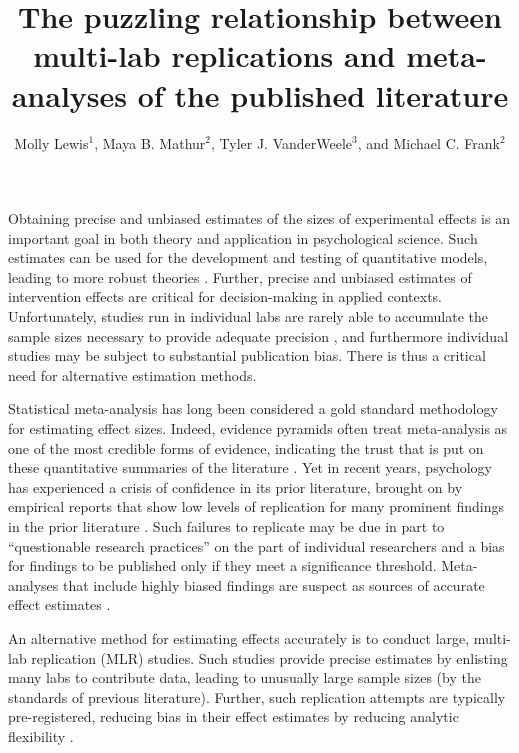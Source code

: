\documentclass[man,floatsintext]{apa7}
\title{The puzzling relationship between multi-lab replications and 
meta-analyses of the published literature
}
\author{Molly Lewis$^{1}$, Maya B. Mathur$^{2}$, Tyler J. VanderWeele$^{3}$, and Michael C. Frank$^{2}$}
\affiliation{$^{1}$Carnegie Mellon University\\
$^{2}$Stanford University\\
$^{3}$Harvard University}
\begin{document}
\maketitle


Obtaining precise and unbiased estimates of the sizes of experimental effects is an important goal in both theory and application in psychological science. Such estimates can be used for the development and testing of quantitative models, leading to more robust theories \parencite{oberauer2019addressing}. Further, precise and unbiased estimates of intervention effects are critical for decision-making in applied contexts. Unfortunately, studies run in individual labs are rarely able to accumulate the sample sizes necessary to provide adequate precision \parencite{simonsohn_2014}, and furthermore individual studies may be subject to substantial publication bias.  There is thus a critical need for alternative estimation methods. 

Statistical meta-analysis \parencite{gurevitch2018meta,dersimonian1986meta} has long been considered a gold standard methodology for estimating effect sizes. Indeed, evidence pyramids often treat meta-analysis as one of the most credible forms of evidence, indicating the trust that is put on these quantitative summaries of the literature \parencite{higgins2019cochrane}. Yet in recent years, psychology has experienced a crisis of confidence in its prior literature, brought on by empirical reports that show low levels of replication for many prominent findings in the prior literature \parencite{open2015estimating,klein2014investigating,klein2018many,ebersole2016many,ebersole2020many}. Such failures to replicate may be due in part to “questionable research practices” on the part of individual researchers \parencite[e.g., post-hoc analytic decision-making;][]{masicampo2012peculiar} and a bias for findings to be published only if they meet a significance threshold. Meta-analyses that include highly biased findings are suspect as sources of accurate effect estimates  \parencite[or even as indicators of whether an effect is consistently non-zero;][]{vadillo2016selection}. 

An alternative method for estimating effects accurately is to conduct large, multi-lab replication (MLR) studies. Such studies provide precise estimates by enlisting many labs to contribute data, leading to unusually large sample sizes (by the standards of previous literature). Further, such replication attempts are typically pre-registered, reducing bias in their effect estimates by reducing analytic flexibility \parencite{nosek2018preregistration}. 
\end{document}

